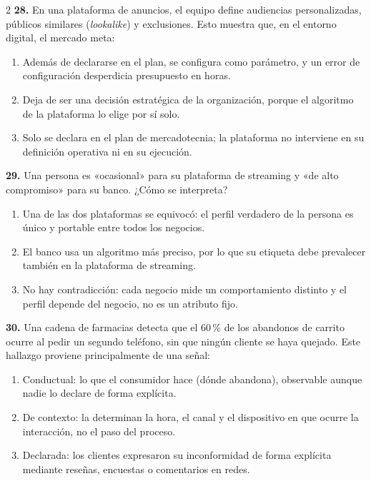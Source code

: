 \documentclass[10pt,letterpaper]{article}
\begin{document}
\begin{multicols}{2}
\vspace{2pt}
\noindent\textbf{28.} En una plataforma de anuncios, el equipo define audiencias personalizadas, públicos similares (\textit{lookalike}) y exclusiones. Esto muestra que, en el entorno digital, el mercado meta:
\vspace{-3pt}
\begin{enumerate}[label=\alph*),leftmargin=1.1em,itemsep=0pt,topsep=1pt,parsep=0pt,partopsep=0pt]
\item Además de declararse en el plan, se configura como parámetro, y un error de configuración desperdicia presupuesto en horas.
\item Deja de ser una decisión estratégica de la organización, porque el algoritmo de la plataforma lo elige por sí solo.
\item Solo se declara en el plan de mercadotecnia; la plataforma no interviene en su definición operativa ni en su ejecución.
\end{enumerate}
\vspace{2pt}
\noindent\textbf{29.} Una persona es «ocasional» para su plataforma de streaming y «de alto compromiso» para su banco. ¿Cómo se interpreta?
\vspace{-3pt}
\begin{enumerate}[label=\alph*),leftmargin=1.1em,itemsep=0pt,topsep=1pt,parsep=0pt,partopsep=0pt]
\item Una de las dos plataformas se equivocó: el perfil verdadero de la persona es único y portable entre todos los negocios.
\item El banco usa un algoritmo más preciso, por lo que su etiqueta debe prevalecer también en la plataforma de streaming.
\item No hay contradicción: cada negocio mide un comportamiento distinto y el perfil depende del negocio, no es un atributo fijo.
\end{enumerate}
\vspace{2pt}
\noindent\textbf{30.} Una cadena de farmacias detecta que el 60\,\% de los abandonos de carrito ocurre al pedir un segundo teléfono, sin que ningún cliente se haya quejado. Este hallazgo proviene principalmente de una señal:
\vspace{-3pt}
\begin{enumerate}[label=\alph*),leftmargin=1.1em,itemsep=0pt,topsep=1pt,parsep=0pt,partopsep=0pt]
\item Conductual: lo que el consumidor hace (dónde abandona), observable aunque nadie lo declare de forma explícita.
\item De contexto: la determinan la hora, el canal y el dispositivo en que ocurre la interacción, no el paso del proceso.
\item Declarada: los clientes expresaron su inconformidad de forma explícita mediante reseñas, encuestas o comentarios en redes.
\end{enumerate}
\vspace{2pt}
\end{multicols}
\end{document}
